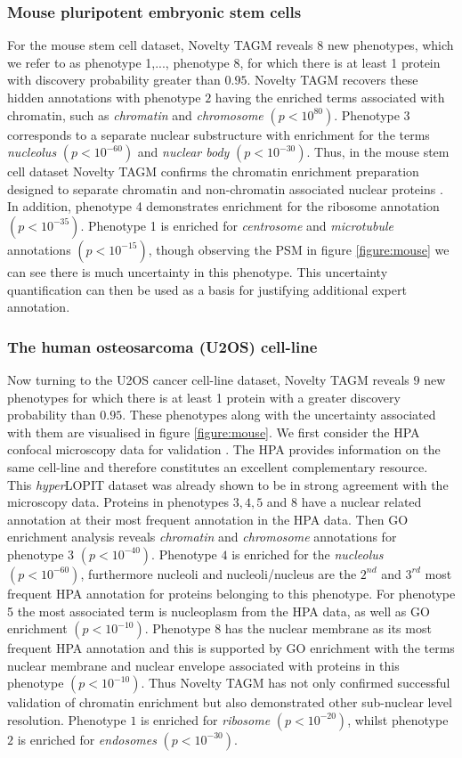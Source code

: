 \documentclass[12pt,english]{article}
\begin{document}
\subsubsection{Mouse pluripotent embryonic stem cells}
For the mouse stem cell dataset, Novelty TAGM reveals $8$ new phenotypes, which we refer to as phenotype 1,..., phenotype 8, for which there is at least 1 protein with discovery probability greater than $0.95$. Novelty TAGM recovers these hidden annotations with phenotype $2$ having the enriched terms associated with chromatin, such as \textit{chromatin} and \textit{chromosome} $(p < 10^{80})$. Phenotype 3 corresponds to a separate nuclear substructure with enrichment for the terms \textit{nucleolus} $(p < 10^{-60})$ and \textit{nuclear body} $(p < 10^{-30})$. Thus, in the mouse stem cell dataset Novelty TAGM confirms the chromatin enrichment preparation designed to separate chromatin and non-chromatin associated nuclear proteins \citep{Mulvey:2017}. In addition, phenotype 4 demonstrates enrichment for the ribosome annotation $(p < 10^{-35})$. Phenotype 1 is enriched for \textit{centrosome} and \textit{microtubule} annotations $(p < 10^{-15})$, though observing the PSM in figure \ref{figure:mouse} we can see there is much uncertainty in this phenotype. This uncertainty quantification can then be used as a basis for justifying additional expert annotation.

\subsubsection{The human osteosarcoma (U2OS) cell-line}
Now turning to the U2OS cancer cell-line dataset, Novelty TAGM reveals $9$ new phenotypes for which there is at least 1 protein with a greater discovery probability than $0.95$. These phenotypes along with the uncertainty associated with them are visualised in figure \ref{figure:mouse}. We first consider the HPA confocal microscopy data for validation \citep{Thul:2017, Sullivan:2018}. The HPA provides information on the same cell-line and therefore constitutes an excellent complementary resource. This \textit{hyper}LOPIT dataset was already shown to be in strong agreement with the microscopy data. Proteins in phenotypes $3,4,5$ and $8$ have a nuclear related annotation at their most frequent annotation in the HPA data. Then GO enrichment analysis reveals \textit{chromatin} and \textit{chromosome} annotations for phenotype 3 $(p < 10^{-40})$. Phenotype $4$ is enriched for the \textit{nucleolus} $(p < 10^{-60})$, furthermore nucleoli and nucleoli/nucleus are the $2^{nd}$ and $3^{rd}$ most frequent HPA annotation for proteins belonging to this phenotype. For phenotype 5 the most associated term is nucleoplasm from the HPA data, as well as GO enrichment $(p < 10^{-10})$. Phenotype $8$ has the nuclear membrane as its most frequent HPA annotation and this is supported by GO enrichment with the terms nuclear membrane and nuclear envelope associated with proteins in this phenotype $(p < 10^{-10})$. Thus Novelty TAGM has not only confirmed successful validation of chromatin enrichment but also demonstrated other sub-nuclear level resolution. Phenotype $1$ is enriched for \textit{ribosome} $( p < 10^{-20})$, whilst phenotype $2$ is enriched for \textit{endosomes} $(p < 10^{-30})$.
\end{document}
